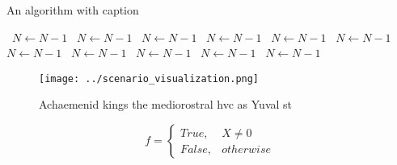 \documentclass[a4paper]{article}
\begin{document}
\begin{algorithm}
\caption{An algorithm with caption}
\begin{algorithmic}
\    \State $N \gets N - 1$
\    \State $N \gets N - 1$
\    \State $N \gets N - 1$
\    \State $N \gets N - 1$
\    \State $N \gets N - 1$
\    \State $N \gets N - 1$
\    \State $N \gets N - 1$
\    \State $N \gets N - 1$
\    \State $N \gets N - 1$
\    \State $N \gets N - 1$
\    \State $N \gets N - 1$
\EndWhile
\end{algorithmic}
\end{algorithm}

\begin{figure}
\centering
\texttt{[image: ../scenario\_visualization.png]}
\caption{Achaemenid kings the mediorostral hvc as Yuval st
}
\end{figure}
 
\begin{equation}   f =
\begin{cases} True, & X \neq 0\\
False, & otherwise
\end{cases}
\end{equation}
\end{document}
